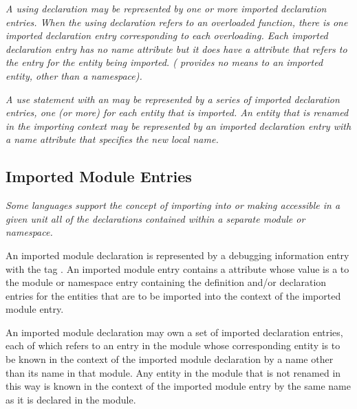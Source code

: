 \textit{A  using declaration may be represented 
by one or more
imported\hypertarget{chap:DWATimportnamespaceusingdeclaration}{} 
declaration entries.  When the using declaration
refers to an overloaded function, there is one imported
declaration entry corresponding to each overloading. Each
imported declaration entry has no name attribute but it does
have a \DWATimportDEFN{} attribute that refers to the entry for the
entity being imported. ( 
provides no means to 
an imported entity, other than a namespace).}


\textit{A  use statement 
with an  may be
represented by a series of imported declaration entries,
one (or more) for each entity that is imported. An entity
that is renamed in the importing context may be represented
by an imported declaration entry with a name attribute that
specifies the new local name.
}

\subsection{Imported Module Entries}
\label{chap:importedmoduleentries}

\textit{Some languages support the concept of importing into or making
accessible in a given unit all of the declarations contained
within a separate module or namespace.
}

An imported module declaration is represented by a debugging
information entry with 
the 
tag \DWTAGimportedmoduleTARG.
An
imported module entry contains a 
\DWATimport{} attribute
whose value is a  
to the module or namespace entry
containing the definition and/or declaration entries for
the entities that are to be imported into the context of the
imported module entry.

An imported module declaration may own a set of imported
declaration entries, each of which refers to an entry in the
module whose corresponding entity is to be known in the context
of the imported module declaration by a name other than its
name in that module. Any entity in the module that is not
renamed in this way is known in the context of the imported
module entry by the same name as it is declared in the module.

